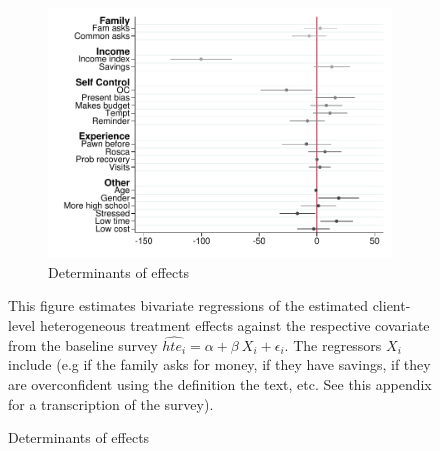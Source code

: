 \documentclass[11pt]{article}
\begin{document}
\begin{figure}[H]
    \caption{Heterogeneous Treatment Effect: Fee-forcing contract}
    \label{HTE_fee_forcing}
    \begin{center}
    \begin{subfigure}{0.7\textwidth}
        \caption{Determinants of effects}
        \centering
        \includegraphics[width=\textwidth]{Figuras/HE/he_int_vertical_fc_admin_disc_pro_2.pdf}
    \end{subfigure}
    
    \end{center}
     \scriptsize  This figure estimates bivariate regressions of the estimated client-level heterogeneous treatment effects against the respective covariate from the baseline survey  $\widehat{hte_i} = \alpha + \beta \: X_i + \epsilon_i$. The regressors $X_i$ include (e.g if the family asks for money, if they have savings, if they are overconfident using the definition the text, etc. See this appendix for a transcription of the survey).
\end{figure}
\end{document}
